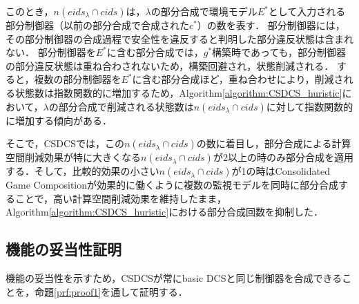 このとき，$n(eids_{\lambda} \cap cids)$は，$\lambda$の部分合成で環境モデル$E^*$として入力される部分制御器（以前の部分合成で合成された$c^*$）の数を表す．
部分制御器には，その部分制御器の合成過程で安全性を違反すると判明した部分違反状態は含まれない．
部分制御器を$E^*$に含む部分合成では，$g^*$構築時であっても，部分制御器の部分違反状態は重ね合わされないため，構築回避され，状態削減される．
すると，複数の部分制御器を$E^*$に含む部分合成ほど，重ね合わせにより，削減される状態数は指数関数的に増加するため，Algorithm\ref{algorithm:CSDCS_huristic}において，$\lambda$の部分合成で削減される状態数は$n(eids_{\lambda} \cap cids)$に対して指数関数的に増加する傾向がある．

そこで，CSDCSでは，この$n(eids_{\lambda} \cap cids)$の数に着目し，部分合成による計算空間削減効果が特に大きくなる$n(eids_{\lambda} \cap cids)$が2以上の時のみ部分合成を適用する．そして，比較的効果の小さい$n(eids_{\lambda} \cap cids)$が1の時はConsolidated Game Compositionが効果的に働くように複数の監視モデルを同時に部分合成することで，高い計算空間削減効果を維持したまま，Algorithm\ref{algorithm:CSDCS_huristic}における部分合成回数を抑制した．


\subsection{機能の妥当性証明}
機能の妥当性を示すため，CSDCSが常にbasic DCSと同じ制御器を合成できることを，命題\ref{prf:proof1}を通して証明する．

